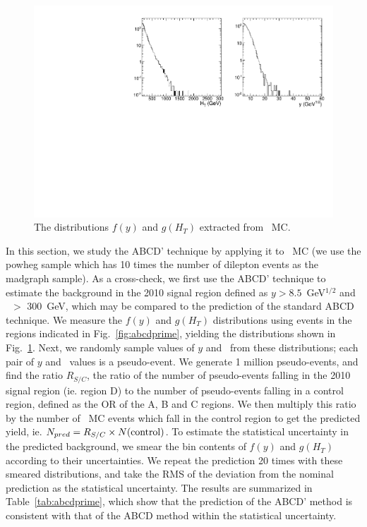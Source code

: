 \begin{figure}[tbh]
\begin{center}
\includegraphics[width=1\linewidth]{plots/abcdprimedist.pdf}
\caption{\label{fig:abcddist}\protect The distributions $f(y)$ and $g(H_T)$ 
extracted from \ttbar\ MC.}
\end{center}
\end{figure}

In this section, we study the ABCD' technique by applying it to \ttbar\ MC (we use the powheg sample which has
10 times the number of dilepton events as the madgraph sample). As a cross-check,
we first use the ABCD' technique to estimate the background in the 2010 signal region
defined as $y > 8.5$~GeV$^{1/2}$ and \Ht\ $>$ 300~GeV, which may be compared to the 
prediction of the standard ABCD technique. We measure the $f(y)$ and $g(H_T)$ distributions
using events in the regions indicated in Fig.~\ref{fig:abcdprime}, yielding the
distributions shown in Fig.~\ref{fig:abcddist}. Next, we randomly sample values of $y$
and \Ht\ from these distributions; each pair of $y$ and \Ht\ values is a pseudo-event.
We generate 1 million pseudo-events, and find the ratio $R_{S/C}$, the ratio of the
number of pseudo-events falling in the 2010 signal region (ie. region D) to the number of pseudo-events
falling in a control region, defined as the OR of the A, B and C regions. We then
multiply this ratio by the number of \ttbar\ MC events which fall in the control region
to get the predicted yield, ie. $N_{pred} = R_{S/C} \times N({\rm control})$. 
To estimate the statistical uncertainty in the predicted background, we smear the bin contents
of $f(y)$ and $g(H_T)$ according to their uncertainties. We repeat the prediction 20 times
with these smeared distributions, and take the RMS of the deviation from the nominal prediction
as the statistical uncertainty. The results
are summarized in Table~\ref{tab:abcdprime}, which show that the prediction of the
ABCD' method is consistent with that of the ABCD method within the statistical uncertainty.

